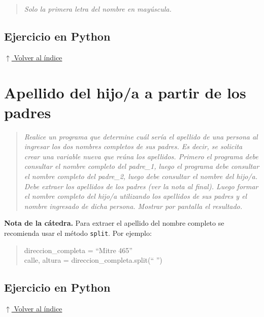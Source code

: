 \documentclass[12pt]{article}
\newcommand{\codigopython}[2]{%
}
\newcommand{\volverindice}{%
    \vspace{1em}%
    \begin{flushright}%
        \hyperlink{indice}{\small $\uparrow$ Volver al índice}%
    \end{flushright}%
}
\newcommand{\enunciado}[1]{%
    \begin{quote}
        \itshape #1
    \end{quote}
}
\begin{document}
\enunciado{Solo la primera letra del nombre en mayúscula.}

\subsection*{Ejercicio en Python}

\codigopython{14}{Formatos de un nombre completo}

\volverindice
\newpage


\section{Apellido del hijo/a a partir de los padres}

\enunciado{Realice un programa que determine cuál sería el apellido de una persona al ingresar los dos nombres completos de sus padres. Es decir, se solicita crear una variable nueva que reúna los apellidos. Primero el programa debe consultar el nombre completo del padre\_1, luego el programa debe consultar el nombre completo del padre\_2, luego debe consultar el nombre del hijo/a. Debe extraer los apellidos de los padres (ver la nota al final). Luego formar el nombre completo del hijo/a utilizando los apellidos de sus padres y el nombre ingresado de dicha persona. Mostrar por pantalla el resultado.}

\textbf{Nota de la cátedra.} Para extraer el apellido del nombre completo se recomienda usar el método \texttt{split}. Por ejemplo:

\begin{quote}
\ttfamily
direccion\_completa = \enquote{Mitre 465}\\
calle, altura = direccion\_completa.split(\enquote{ })
\end{quote}

\subsection*{Ejercicio en Python}

\codigopython{15}{Apellido del hijo/a a partir de los padres}

\volverindice
\end{document}
